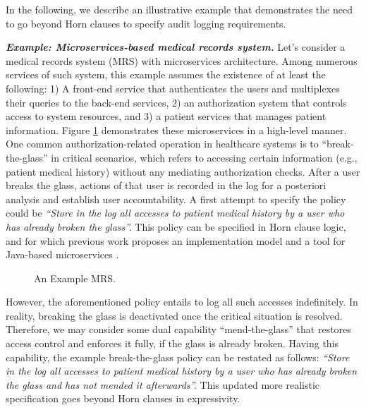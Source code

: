 In the following, we describe an illustrative example that demonstrates the need to go beyond Horn clauses to specify audit logging requirements.

\textbf{\textit{Example: Microservices-based medical records system.}}
Let's consider a medical records system (MRS) with microservices architecture. Among numerous services of such system, this example assumes the existence of at least the following: 1) A front-end service that authenticates the users and multiplexes their queries to the back-end services,  2) an authorization system that controls access to system resources, and 3) a patient services that manages patient information. Figure \ref{fig:mrs-mics} demonstrates these microservices in a high-level manner. One common authorization-related operation in healthcare systems is to ``break-the-glass'' \cite{matthews-gaebel-hie09} in critical scenarios, which refers to accessing certain information (e.g., patient medical history) without any mediating authorization checks. After a user breaks the glass, actions of that user is recorded in the log for a posteriori analysis and establish user accountability.  A first attempt to specify the policy could be \emph{``Store in the log all accesses to patient medical history by a user who has already broken the glass''.}  This policy can be specified in Horn clause logic, and for which previous work proposes an implementation model \cite{lsfa20} and a tool for Java-based  microservices \cite{stpsa21}.  

\begin{figure} 
	\centering
	\caption{An Example MRS.}
	\label{fig:mrs-mics}
\end{figure}

However, the aforementioned policy entails to log all such accesses indefinitely. In reality, breaking the glass is deactivated once the critical situation is resolved. Therefore, we may consider some dual capability ``mend-the-glass'' that restores access control and enforces it fully, if the glass is already broken. Having this capability, the example break-the-glass policy can be restated as follows: \emph{``Store in the log all accesses to patient medical history by a user who has already broken the glass and has not mended it afterwards''.}  This updated more realistic specification goes beyond Horn clauses in expressivity.

